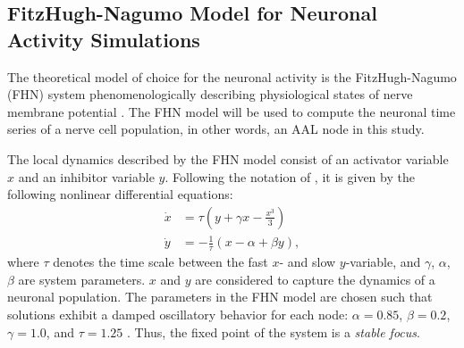 \documentclass[fleqn,10pt]{wlpeerj}
\begin{document}
\subsection*{FitzHugh-Nagumo Model for Neuronal Activity Simulations}
The theoretical model of choice for the neuronal activity is the FitzHugh-Nagumo (FHN) system phenomenologically
describing physiological states of nerve membrane potential \citep{FIT61, NAG62}. The FHN model will be used to
compute the neuronal time series of a nerve cell population, in other words, an AAL node in this study. 

The local dynamics described by the FHN model consist of an activator variable $x$ and an inhibitor variable $y$.
Following the notation of \cite{GHO08a, GHO08}, it is given by the following nonlinear differential equations:
\begin{subequations}
\begin{align}
  \dot{x} &= \tau \left( y + \gamma x - \frac{x^3}{3} \right)  \label{eqn: frobenius 1}\\  
  \dot{y} &=-\frac{1}{\tau} (x - \alpha + \beta y) , \label{eqn: frobenius 2}   
\end{align} 
\end{subequations}
where $\tau$ denotes the time scale between the fast $x$- and slow $y$-variable, 
and $\gamma$, $\alpha$, $\beta$ are system parameters. 
$x$ and $y$ are considered to capture the dynamics of a neuronal population.
The parameters in the FHN model are chosen such that solutions exhibit a damped oscillatory behavior for each node:
$\alpha = 0.85$, $\beta=0.2$, $\gamma=1.0$, and $\tau=1.25$ \citep{VUK13}. Thus, the fixed point of the system is a
\textit{stable focus}.
\end{document}
